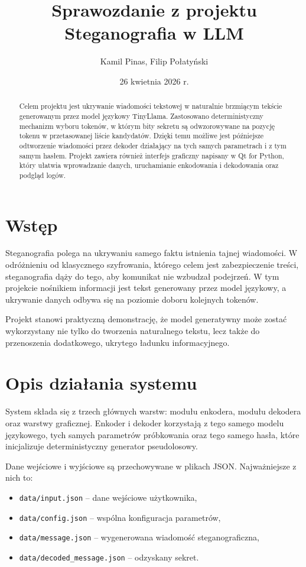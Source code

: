 \documentclass[12pt,a4paper]{article}
\title{Sprawozdanie z projektu\\[0.2cm]{\large Steganografia w LLM}}
\author{Kamil Pinas, Filip Połatyński}
\date{26 kwietnia 2026 r.}
\begin{document}
\maketitle

\begin{abstract}
Celem projektu jest ukrywanie wiadomości tekstowej w naturalnie brzmiącym tekście generowanym przez model językowy TinyLlama. Zastosowano deterministyczny mechanizm wyboru tokenów, w którym bity sekretu są odwzorowywane na pozycję tokenu w przetasowanej liście kandydatów. Dzięki temu możliwe jest późniejsze odtworzenie wiadomości przez dekoder działający na tych samych parametrach i z tym samym hasłem. Projekt zawiera również interfejs graficzny napisany w Qt for Python, który ułatwia wprowadzanie danych, uruchamianie enkodowania i dekodowania oraz podgląd logów.
\end{abstract}

\section{Wstęp}
Steganografia polega na ukrywaniu samego faktu istnienia tajnej wiadomości. W odróżnieniu od klasycznego szyfrowania, którego celem jest zabezpieczenie treści, steganografia dąży do tego, aby komunikat nie wzbudzał podejrzeń. W tym projekcie nośnikiem informacji jest tekst generowany przez model językowy, a ukrywanie danych odbywa się na poziomie doboru kolejnych tokenów.

Projekt stanowi praktyczną demonstrację, że model generatywny może zostać wykorzystany nie tylko do tworzenia naturalnego tekstu, lecz także do przenoszenia dodatkowego, ukrytego ładunku informacyjnego. 


\section{Opis działania systemu}
System składa się z trzech głównych warstw: modułu enkodera, modułu dekodera oraz warstwy graficznej. Enkoder i dekoder korzystają z tego samego modelu językowego, tych samych parametrów próbkowania oraz tego samego hasła, które inicjalizuje deterministyczny generator pseudolosowy.

Dane wejściowe i wyjściowe są przechowywane w plikach JSON. Najważniejsze z nich to:
\begin{itemize}
    \item \texttt{data/input.json} -- dane wejściowe użytkownika,
    \item \texttt{data/config.json} -- wspólna konfiguracja parametrów,
    \item \texttt{data/message.json} -- wygenerowana wiadomość steganograficzna,
    \item \texttt{data/decoded\_message.json} -- odzyskany sekret.
\end{itemize}
\end{document}
